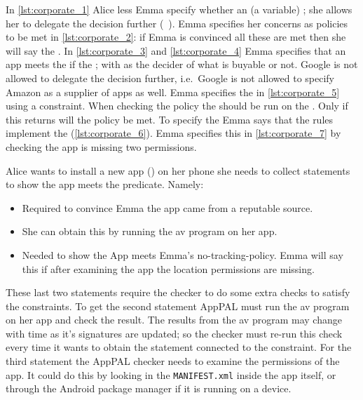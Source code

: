 \documentclass[]{llncs}
\begin{document}
In \autoref{lst:corporate_1} Alice less Emma  specify whether an  (a variable) ;
she allows her to delegate the decision further (\/~).
Emma specifies her concerns as policies to be met in \autoref{lst:corporate_2}:
  if Emma is convinced all these are met then she will say the .
In \autoref{lst:corporate_3} and \autoref{lst:corporate_4} Emma specifies that an app meets the  if the ;
  with  as the decider of what is buyable or not.
Google is not allowed to delegate the decision further, i.e.~Google is not allowed to specify Amazon as a supplier of apps as well.
Emma specifies the  in \autoref{lst:corporate_5} using a constraint.
When checking the policy the  should be run on the .
Only if this returns  will the policy be met.
To specify the  Emma says that the  rules implement the  (\autoref{lst:corporate_6}).
Emma specifies this in \autoref{lst:corporate_7} by checking the app is missing two permissions.

Alice wants to install a new app () on her phone
she needs to collect statements to show the app meets the  predicate.
Namely:
\begin{itemize}
  \item{}
    Required to convince Emma the app came from a reputable source.
  \item{}
    She can obtain this by running the \ac{av} program on her app.
  \item{}
    Needed to show the App meets Emma's no-tracking-policy.
    Emma will say this if after examining the app the location permissions are missing.
\end{itemize}
These last two statements require the checker to do some extra checks to satisfy the constraints.
To get the second statement AppPAL must run the \ac{av} program on her app and check the result.
The results from the \ac{av} program may change with time as it's signatures are updated;
  so the checker must re-run this check every time it wants to obtain the statement connected to the constraint.
For the third statement the AppPAL checker needs to examine the permissions of the app.
It could do this by looking in the \texttt{MANIFEST.xml} inside the app itself, or through the Android package manager if it is running on a device.
\end{document}
